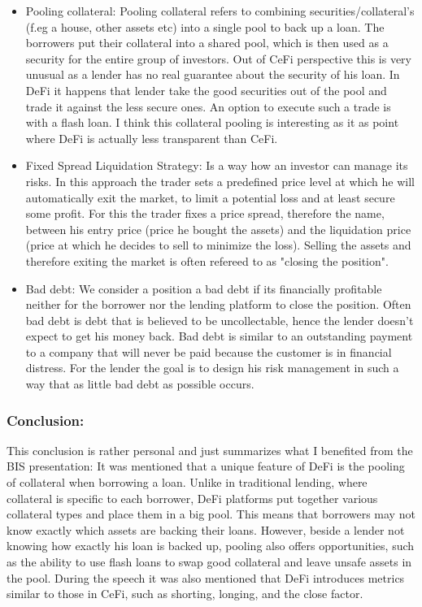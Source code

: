 \documentclass{article}
\begin{document}
\begin{itemize}
\item {Pooling collateral}: 
Pooling collateral refers to combining securities/collateral's (f.eg a house, other assets etc) into a single pool to back up a loan. The borrowers put their collateral into a shared pool, which is then used as a security for the entire group of investors. Out of CeFi perspective this is very unusual as a lender has no real guarantee about the security of his loan. In DeFi it happens that lender take the good securities out of the pool and trade it against the less secure ones. An option to execute such a trade is with a flash loan. I think this collateral pooling is interesting as it as point where DeFi is actually less transparent than CeFi.

\item {Fixed Spread Liquidation Strategy}:
Is a way how an investor can manage its risks. In this approach the trader sets a predefined price level at which he will automatically exit the market, to limit a potential loss and at least secure some profit. For this the trader fixes a price spread, therefore the name, between his entry price (price he bought the assets) and the liquidation price (price at which he decides to sell to minimize the loss). Selling the assets and therefore exiting the market is often refereed to as "closing the position".

\item {Bad debt}: We consider a position a bad debt if its financially profitable neither for the borrower nor the lending platform to close the position. Often bad debt is debt that is believed to be uncollectable, hence the lender doesn't expect to get his money back. Bad debt is similar to an outstanding payment to a company that will never be paid because the customer is in financial distress. For the lender the goal is to design his risk management in such a way that as little bad debt as possible occurs.
\end{itemize}
\subsubsection{Conclusion:} %
This conclusion is rather personal and just summarizes what I benefited from the BIS presentation: It was mentioned that a unique feature of DeFi is the pooling of collateral when borrowing a loan. Unlike in traditional lending, where collateral is specific to each borrower, DeFi platforms put together various collateral types and place them in a big pool. This means that borrowers may not know exactly which assets are backing their loans. However, beside a lender not knowing how exactly his loan is backed up, pooling also offers opportunities, such as the ability to use flash loans to swap good collateral and leave unsafe assets in the pool. During the speech it was also mentioned that DeFi introduces metrics similar to those in CeFi, such as shorting, longing, and the close factor.
\end{document}
